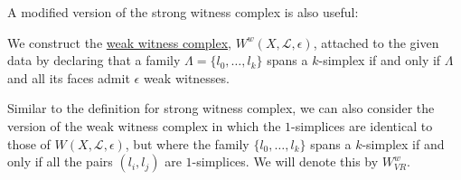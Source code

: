 A modified version of the strong witness complex is also useful:

\begin{defn}
	We construct the \underline{weak witness complex}, $W^w(X,\mathcal{L}, \epsilon)$, attached to the given data by declaring that a family $\Lambda = \{l_0, \dots, l_k\}$ spans a $k$-simplex if and only if $\Lambda$ and all its faces admit $\epsilon$ weak witnesses. 
	
	Similar to the definition for strong witness complex, we can also consider the version of the weak witness complex in which the $1$-simplices are identical to those of $W(X,\mathcal{L},\epsilon)$, but where the family $\{l_0, \dots, l_k\}$ spans a $k$-simplex if and only if all the pairs $(l_i, l_j)$ are $1$-simplices. We will denote this by $W^w_{VR}$.
\end{defn}